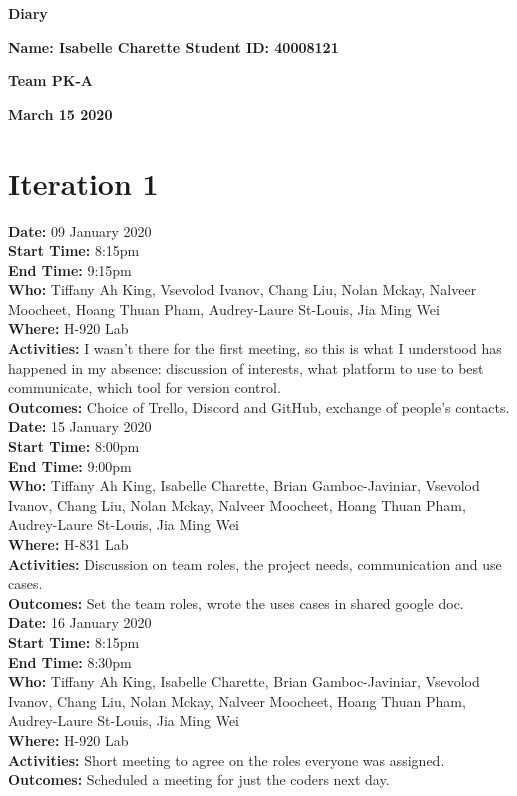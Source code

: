 \documentclass[12pt]{article}
\begin{document}
\vspace*{0.2in}
\centerline{\bf\Large Diary}

\vspace*{0.2in}
\centerline{\bf\Large Name: Isabelle Charette   Student ID: 40008121}

\vspace*{0.2in}
\centerline{\bf\Large Team PK-A}

\vspace*{0.2in}
\centerline{\bf\Large March 15 2020}

\section{Iteration 1}

{\bf Date:} 09 January 2020\\
{\bf Start Time:} 8:15pm\\
{\bf End Time:} 9:15pm\\
{\bf Who:} Tiffany Ah King, Vsevolod Ivanov, Chang Liu, Nolan Mckay, Nalveer Moocheet, Hoang Thuan Pham, Audrey-Laure St-Louis, Jia Ming Wei\\
{\bf Where:} H-920 Lab \\
{\bf Activities:} I wasn't there for the first meeting, so this is what I understood has happened in my absence: discussion of interests, what platform to use to best communicate, which tool for version control.\\
{\bf Outcomes:} Choice of Trello, Discord and GitHub, exchange of people's contacts.\\

{\bf Date:} 15 January 2020\\
{\bf Start Time:} 8:00pm\\
{\bf End Time:} 9:00pm\\
{\bf Who:} Tiffany Ah King, Isabelle Charette, Brian Gamboc-Javiniar, Vsevolod Ivanov, Chang Liu, Nolan Mckay, Nalveer Moocheet, Hoang Thuan Pham, Audrey-Laure St-Louis, Jia Ming Wei\\
{\bf Where:} H-831 Lab \\
{\bf Activities:} Discussion on team roles, the project needs, communication and use cases.\\
{\bf Outcomes:} Set the team roles, wrote the uses cases in shared google doc.\\

{\bf Date:} 16 January 2020\\
{\bf Start Time:} 8:15pm \\
{\bf End Time:} 8:30pm\\
{\bf Who:} Tiffany Ah King, Isabelle Charette, Brian Gamboc-Javiniar, Vsevolod Ivanov, Chang Liu, Nolan Mckay, Nalveer Moocheet, Hoang Thuan Pham, Audrey-Laure St-Louis, Jia Ming Wei\\
{\bf Where:} H-920 Lab \\
{\bf Activities:} Short meeting to agree on the roles everyone was assigned.\\
{\bf Outcomes:} Scheduled a meeting for just the coders next day.\\
\end{document}
